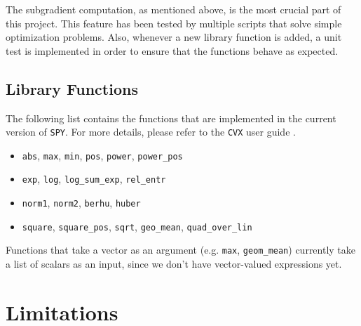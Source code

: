 \documentclass[12pt]{article}
\begin{document}
The subgradient computation, as mentioned above, is the most crucial part of this project. This feature has been tested by multiple scripts that solve simple optimization problems. Also, whenever a new library function is added, a unit test is implemented in order to ensure that the functions behave as expected.

\subsection{Library Functions}
The following list contains the functions that are implemented in the current version of \verb'SPY'. For more details, please refer to the \verb'CVX' user guide \cite{guide}.
\begin{itemize}
\item \verb'abs', \verb'max', \verb'min', \verb'pos', \verb'power', \verb'power_pos'
\item \verb'exp', \verb'log', \verb'log_sum_exp', \verb'rel_entr'
\item \verb'norm1', \verb'norm2', \verb'berhu', \verb'huber'
\item \verb'square', \verb'square_pos', \verb'sqrt', \verb'geo_mean', \verb'quad_over_lin'
\end{itemize}
Functions that take a vector as an argument (e.g. \verb'max', \verb'geom_mean') currently take a list of scalars as an input, since we don't have vector-valued expressions yet.

\section{Limitations}
\end{document}
